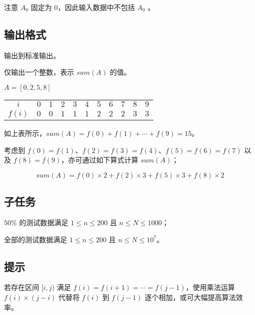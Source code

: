 注意 $A_0$
固定为 $0$，因此输入数据中不包括 $A_0$
。

\subsection*{输出格式}

输出到标准输出。

仅输出一个整数，表示 $sum(A)$ 的值。

\examplebox*{}{}

$A=[0, 2, 5, 8]$

\begin{table}[H]
    \centering
    \begin{tabular}{ccccccccccc}
        \toprule
        $i$    & $0$ & $1$ & $2$ & $3$ & $4$ & $5$ & $6$ & $7$ & $8$ & $9$ \\
        $f(i)$ & $0$ & $0$ & $1$ & $1$ & $1$ & $2$ & $2$ & $2$ & $3$ & $3$ \\
        \bottomrule
    \end{tabular}
\end{table}

如上表所示，$sum(A)=f(0)+f(1)+\cdots + f(9)=15$。

考虑到 $f(0)=f(1)$、$f(2)=f(3)=f(4)$、$f(5)=f(6)=f(7)$ 以及 $f(8)=f(9)$，亦可通过如下算式计算 $sum(A)$；

\begin{equation*}
    sum(A)=f(0)\times 2+f(2)\times 3+f(5)\times 3 + f(8)\times 2
\end{equation*}

\examplebox{}{}

\subsection*{子任务}

$50\%$  的测试数据满足 $1\le n\le 200$ 且 $n\le N\le 1000$；

全部的测试数据满足 $1\le n\le 200$ 且 $n\le N\le 10^7$。

\subsection*{提示}

若存在区间 $[i,j)$ 满足 $f(i)=f(i+1)=\cdots=f(j-1)$，使用乘法运算 $f(i)\times (j-i)$ 代替将 $f(i)$ 到 $f(j-1)$ 逐个相加，或可大幅提高算法效率。
